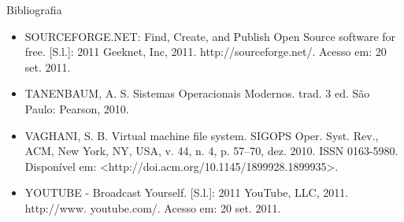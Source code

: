 \documentclass{beamer}
\begin{document}
\begin{frame}{Bibliografia}
\begin{itemize}
\item SOURCEFORGE.NET: Find, Create, and Publish Open Source software for free. [S.l.]: 2011 Geeknet, Inc, 2011. http://sourceforge.net/. Acesso em: 20 set. 2011.
\item TANENBAUM, A. S. Sistemas Operacionais Modernos. trad. 3 ed. São Paulo: Pearson, 2010.
\item VAGHANI, S. B. Virtual machine file system. SIGOPS Oper. Syst. Rev., ACM, New York, NY, USA, v. 44, n. 4, p. 57–70, dez. 2010. ISSN 0163-5980. Disponível em: <http://doi.acm.org/10.1145/1899928.1899935>.
\item YOUTUBE - Broadcast Yourself. [S.l.]: 2011 YouTube, LLC, 2011. http://www.
youtube.com/. Acesso em: 20 set. 2011.
\end{itemize}
\end{frame}
\end{document}
